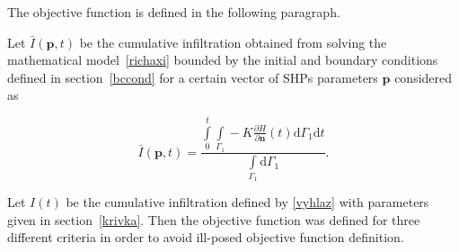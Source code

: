 \documentclass[review]{elsarticle}
\newenvironment{lineq}
    {\begin{linenomath*}
    \begin{equation}
    }
    { 
    \end{equation} 
    \end{linenomath*}
    }
\newcommand{\dd}{\mathrm{d}}
\renewcommand{\vec}{\mathbf}
\begin{document}
The objective function is defined in the following paragraph.


Let $\bar{I}(\vec{p},t)$ be the cumulative infiltration obtained from solving the mathematical model~\eqref{richaxi} bounded by the initial and boundary conditions  defined in section~\ref{bccond} for a certain vector of SHPs parameters $\vec{p}$ considered as
\begin{lineq}\bar{I}(\vec{p},t) = \frac{\int\limits_0^t \int\limits_{\Gamma_1}-K \frac{\partial H}{\partial \vec{n}}(t)  \dd \Gamma_1 \dd t}{\int\limits_{\Gamma_1} \dd \Gamma_1}.\end{lineq}
Let $I(t)$ be the cumulative infiltration defined by \eqref{vyhlaz} with parameters given in section~\ref{krivka}. 
Then the objective function was defined for three different criteria in order to avoid ill-posed objective function definition.
\end{document}
